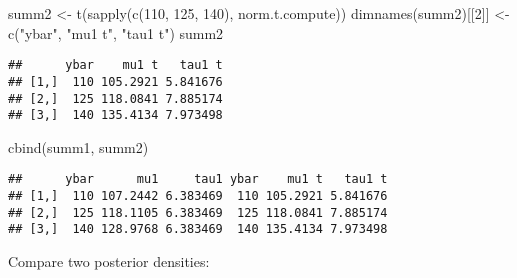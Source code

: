 \documentclass[
]{book}
\newenvironment{Shaded}{\begin{snugshade}}{\end{snugshade}}
\newcommand{\DecValTok}[1]{\textcolor[rgb]{0.00,0.00,0.81}{#1}}
\newcommand{\FunctionTok}[1]{\textcolor[rgb]{0.00,0.00,0.00}{#1}}
\newcommand{\NormalTok}[1]{#1}
\newcommand{\OtherTok}[1]{\textcolor[rgb]{0.56,0.35,0.01}{#1}}
\newcommand{\StringTok}[1]{\textcolor[rgb]{0.31,0.60,0.02}{#1}}
\begin{document}
\begin{Shaded}
\begin{Highlighting}[]
\NormalTok{summ2 }\OtherTok{\textless{}{-}} \FunctionTok{t}\NormalTok{(}\FunctionTok{sapply}\NormalTok{(}\FunctionTok{c}\NormalTok{(}\DecValTok{110}\NormalTok{, }\DecValTok{125}\NormalTok{, }\DecValTok{140}\NormalTok{),}
\NormalTok{                  norm.t.compute))}
\FunctionTok{dimnames}\NormalTok{(summ2)[[}\DecValTok{2}\NormalTok{]] }\OtherTok{\textless{}{-}} \FunctionTok{c}\NormalTok{(}\StringTok{"ybar"}\NormalTok{, }\StringTok{"mu1 t"}\NormalTok{, }
                          \StringTok{"tau1 t"}\NormalTok{)}
\NormalTok{summ2}
\end{Highlighting}
\end{Shaded}

\begin{verbatim}
##      ybar    mu1 t   tau1 t
## [1,]  110 105.2921 5.841676
## [2,]  125 118.0841 7.885174
## [3,]  140 135.4134 7.973498
\end{verbatim}

\begin{Shaded}
\begin{Highlighting}[]
\FunctionTok{cbind}\NormalTok{(summ1, summ2)}
\end{Highlighting}
\end{Shaded}

\begin{verbatim}
##      ybar      mu1     tau1 ybar    mu1 t   tau1 t
## [1,]  110 107.2442 6.383469  110 105.2921 5.841676
## [2,]  125 118.1105 6.383469  125 118.0841 7.885174
## [3,]  140 128.9768 6.383469  140 135.4134 7.973498
\end{verbatim}

Compare two posterior densities:
\end{document}

